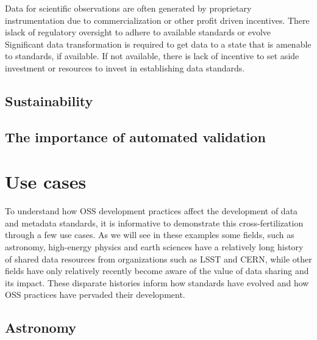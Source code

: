 \documentclass[
  letterpaper,
  DIV=11,
  numbers=noendperiod]{scrartcl}
\begin{document}
Data for scientific observations are often generated by proprietary
instrumentation due to commercialization or other profit driven
incentives. There islack of regulatory oversight to adhere to available
standards or evolve Significant data transformation is required to get
data to a state that is amenable to standards, if available. If not
available, there is lack of incentive to set aside investment or
resources to invest in establishing data standards.

\subsection{Sustainability}\label{sustainability}

\subsection{The importance of automated
validation}\label{the-importance-of-automated-validation}

\section{Use cases}\label{use-cases}

To understand how OSS development practices affect the development of
data and metadata standards, it is informative to demonstrate this
cross-fertilization through a few use cases. As we will see in these
examples some fields, such as astronomy, high-energy physics and earth
sciences have a relatively long history of shared data resources from
organizations such as LSST and CERN, while other fields have only
relatively recently become aware of the value of data sharing and its
impact. These disparate histories inform how standards have evolved and
how OSS practices have pervaded their development.

\subsection{Astronomy}\label{astronomy}
\end{document}
